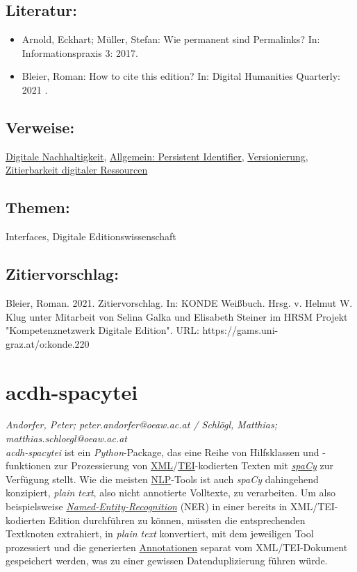 \documentclass{article}
\begin{document}
        \subsection*{Literatur:}\begin{itemize}\item Arnold, Eckhart; Müller, Stefan: Wie permanent sind Permalinks? In: Informationspraxis 3: 2017.\item Bleier, Roman: How to cite this edition? In: Digital Humanities Quarterly: 2021
                              .\end{itemize}\subsection*{Verweise:}\href{https://gams.uni-graz.at/o:konde.6}{Digitale Nachhaltigkeit}, \href{https://gams.uni-graz.at/o:konde.12}{Allgemein: Persistent
                           Identifier}, \href{https://gams.uni-graz.at/o:konde.14}{Versionierung}, \href{https://gams.uni-graz.at/o:konde.219}{Zitierbarkeit digitaler
                           Ressourcen}\subsection*{Themen:}Interfaces, Digitale Editionswissenschaft\subsection*{Zitiervorschlag:}Bleier, Roman. 2021. Zitiervorschlag. In: KONDE Weißbuch. Hrsg. v. Helmut W. Klug unter Mitarbeit von Selina Galka und Elisabeth Steiner im HRSM Projekt "Kompetenznetzwerk Digitale Edition". URL: https://gams.uni-graz.at/o:konde.220\newpage\section*{acdh-spacytei} \emph{Andorfer, Peter; peter.andorfer@oeaw.ac.at / Schlögl, Matthias;
                  matthias.schloegl@oeaw.ac.at}\\
        
    \emph{acdh-spacytei} ist ein \emph{Python}-Package, das eine Reihe von Hilfsklassen und -funktionen zur
                  Prozessierung von \href{http://gams.uni-graz.at/o:konde.215}{XML}/\href{http://gams.uni-graz.at/o:konde.178}{TEI}-kodierten Texten mit \emph{\href{http://gams.uni-graz.at/o:konde.170}{spaCy}} zur Verfügung stellt. Wie die meisten \href{http://gams.uni-graz.at/o:konde.145}{NLP}-Tools ist auch \emph{spaCy}
                  dahingehend konzipiert, \emph{plain text}, also nicht annotierte
                  Volltexte, zu verarbeiten. Um also beispielsweise \emph{\href{http://gams.uni-graz.at/o:konde.141}{Named-Entity-Recognition}} (NER) in einer bereits in XML/TEI-kodierten Edition durchführen zu können,
                  müssten die entsprechenden Textknoten extrahiert, in \emph{plain text
                  } konvertiert, mit dem jeweiligen Tool prozessiert und die generierten \href{http://gams.uni-graz.at/o:konde.17}{Annotationen} separat vom
                  XML/TEI-Dokument gespeichert werden, was zu einer gewissen Datenduplizierung
                  führen würde. \\
            
\end{document}
